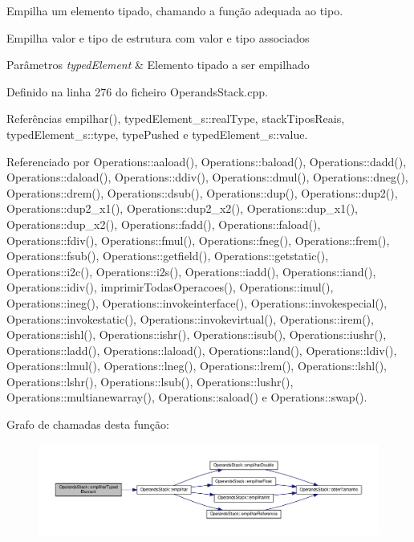 Empilha um elemento tipado, chamando a função adequada ao tipo. 

Empilha valor e tipo de estrutura com valor e tipo associados


\begin{DoxyParams}{Parâmetros}
{\em typed\+Element} & Elemento tipado a ser empilhado \\
\hline
\end{DoxyParams}


Definido na linha 276 do ficheiro Operands\+Stack.\+cpp.



Referências empilhar(), typed\+Element\+\_\+s\+::real\+Type, stack\+Tipos\+Reais, typed\+Element\+\_\+s\+::type, type\+Pushed e typed\+Element\+\_\+s\+::value.



Referenciado por Operations\+::aaload(), Operations\+::baload(), Operations\+::dadd(), Operations\+::daload(), Operations\+::ddiv(), Operations\+::dmul(), Operations\+::dneg(), Operations\+::drem(), Operations\+::dsub(), Operations\+::dup(), Operations\+::dup2(), Operations\+::dup2\+\_\+x1(), Operations\+::dup2\+\_\+x2(), Operations\+::dup\+\_\+x1(), Operations\+::dup\+\_\+x2(), Operations\+::fadd(), Operations\+::faload(), Operations\+::fdiv(), Operations\+::fmul(), Operations\+::fneg(), Operations\+::frem(), Operations\+::fsub(), Operations\+::getfield(), Operations\+::getstatic(), Operations\+::i2c(), Operations\+::i2s(), Operations\+::iadd(), Operations\+::iand(), Operations\+::idiv(), imprimir\+Todas\+Operacoes(), Operations\+::imul(), Operations\+::ineg(), Operations\+::invokeinterface(), Operations\+::invokespecial(), Operations\+::invokestatic(), Operations\+::invokevirtual(), Operations\+::irem(), Operations\+::ishl(), Operations\+::ishr(), Operations\+::isub(), Operations\+::iushr(), Operations\+::ladd(), Operations\+::laload(), Operations\+::land(), Operations\+::ldiv(), Operations\+::lmul(), Operations\+::lneg(), Operations\+::lrem(), Operations\+::lshl(), Operations\+::lshr(), Operations\+::lsub(), Operations\+::lushr(), Operations\+::multianewarray(), Operations\+::saload() e Operations\+::swap().

Grafo de chamadas desta função\+:\nopagebreak
\begin{figure}[H]
\begin{center}
\leavevmode
\includegraphics[width=350pt]{classOperandsStack_a73960b4536c99847bf4545a45f04f089_cgraph}
\end{center}
\end{figure}
\mbox{\label{classOperandsStack_aa6dbee87661011453ba2c57405bd9a4e}} 
